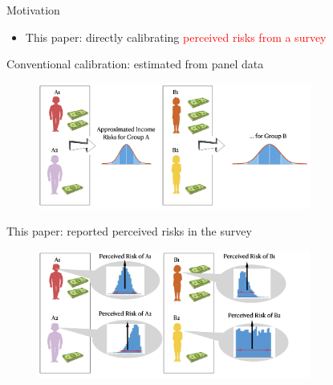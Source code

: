 \documentclass{beamer}
\begin{document}
\begin{frame}{Motivation}
\begin{itemize}
\begin{itemize}
		\item This paper: directly calibrating \textcolor{red}{perceived risks from a survey}
	\end{itemize}
	\end{itemize}
\end{frame}



\begin{frame}{Conventional calibration: estimated from panel data}
	\begin{figure}
		\centering
		\label{fig: conventional_approach}
		\includegraphics[width=0.8\textwidth]{figures/conventional_approach.png}
	\end{figure}
	
\end{frame}


\begin{frame}{This paper: reported perceived risks in the survey}
	\begin{figure}
		\centering
		\label{fig: my_approach}
		\includegraphics[width=0.8\textwidth]{figures/my_approach.png}
	\end{figure}
	
\end{frame}
\end{document}
